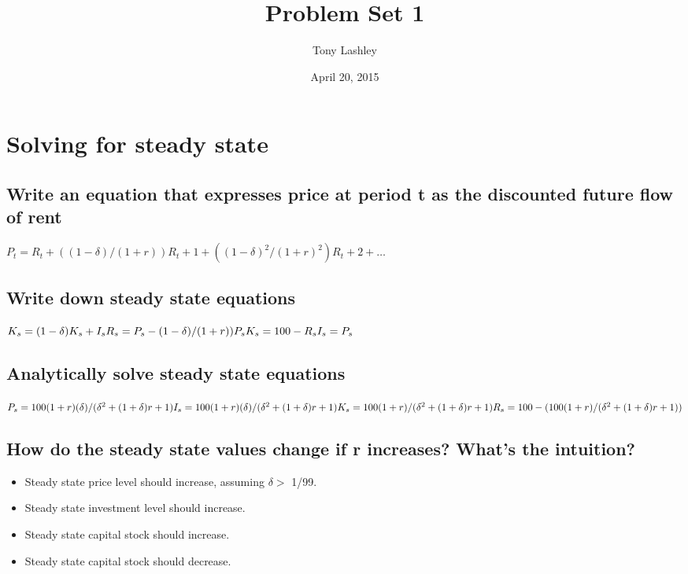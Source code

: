 \documentclass{article}\usepackage[]{graphicx}\usepackage[]{color}
\title{Problem Set 1}
\author{Tony Lashley}
\date{April 20, 2015}
\begin{document}
\section{Solving for steady state}
\subsection{Write an equation that expresses price at period t as the discounted future flow of rent}

\begin{math}
P_t = R_t + ((1 - \delta) / (1 + r))R_t+1 + ((1 - \delta)^2 / (1 + r)^2)R_t+2 + \ldots
\end{math}

\subsection{Write down steady state equations}

\begin{math}
K_s = (1 - \delta)K_s + I_s \newline
R_s = P_s - (1 - \delta) / (1 + r))P_s \newline
K_s = 100 - R_s \newline
I_s = P_s \newline
\end{math}

\subsection{Analytically solve steady state equations}

\begin{math}
P_s = 100(1 + r)(\delta) / (\delta^2 + (1 + \delta)r + 1) \\
I_s = 100(1 + r)(\delta) / (\delta^2 + (1 + \delta)r + 1) \\
K_s = 100(1 + r) / (\delta^2 + (1 + \delta)r + 1) \\
R_s = 100 - (100(1 + r) / (\delta^2 + (1 + \delta)r + 1)) \\
\end{math}

\subsection{How do the steady state values change if r increases? What's the intuition?}

\begin{itemize}
  \item Steady state price level should increase, assuming $\delta >$ 1/99. \\
  \item Steady state investment level should increase. \\
  \item Steady state capital stock should increase. \\
  \item Steady state capital stock should decrease. \\
\end{itemize}
\end{document}
